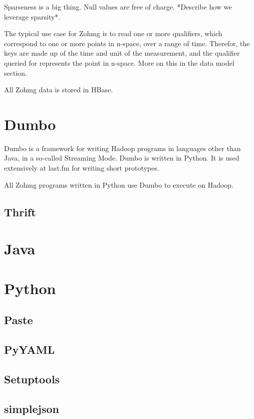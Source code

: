 \documentclass[a4paper,10pt]{book}
\begin{document}
Sparseness is a big thing. Null values are free of charge. *Describe how we leverage sparsity*.

The typical use case for Zohmg is to read one or more qualifiers, which correspond to one or more points in n-space, over a range of time. Therefor, the keys are made up of the time and unit of the measurement, and the qualifier queried for represents the point in n-space. More on this in the data model section.


All Zohmg data is stored in HBase.

\section{Dumbo}

Dumbo is a framework for writing Hadoop programs in languages other than Java, in a so-called Streaming Mode. Dumbo is written in Python. It is used extensively at last.fm for writing short prototypes.

All Zohmg programs written in Python use Dumbo to execute on Hadoop.

\subsection{Thrift}

\section{Java}

\section{Python}

\subsection{Paste}

\subsection{PyYAML}

\subsection{Setuptools}

\subsection{simplejson}
\end{document}
